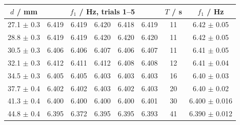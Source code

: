 \begin{tabular}{@{}cccccccc@{}}
\toprule
$d$ / mm & \multicolumn{5}{c}{$f_1$ / Hz, trials 1--5} & $T$ / s & $f_1$ / Hz \\
\midrule
27.1 $\pm$ 0.3 & 6.419 & 6.419 & 6.420 & 6.418 & 6.419 & 11 & 6.42 $\pm$ 0.05 \\
28.8 $\pm$ 0.3 & 6.419 & 6.419 & 6.420 & 6.420 & 6.420 & 11 & 6.42 $\pm$ 0.05 \\
30.5 $\pm$ 0.3 & 6.406 & 6.406 & 6.407 & 6.406 & 6.407 & 11 & 6.41 $\pm$ 0.05 \\
32.1 $\pm$ 0.3 & 6.412 & 6.411 & 6.412 & 6.408 & 6.408 & 12 & 6.41 $\pm$ 0.04 \\
34.5 $\pm$ 0.3 & 6.405 & 6.405 & 6.403 & 6.403 & 6.403 & 16 & 6.40 $\pm$ 0.03 \\
37.7 $\pm$ 0.4 & 6.402 & 6.402 & 6.403 & 6.402 & 6.403 & 20 & 6.40 $\pm$ 0.02 \\
41.3 $\pm$ 0.4 & 6.400 & 6.400 & 6.400 & 6.400 & 6.401 & 30 & 6.400 $\pm$ 0.016 \\
44.8 $\pm$ 0.4 & 6.395 & 6.372 & 6.395 & 6.395 & 6.393 & 41 & 6.390 $\pm$ 0.012 \\
\bottomrule
\end{tabular}